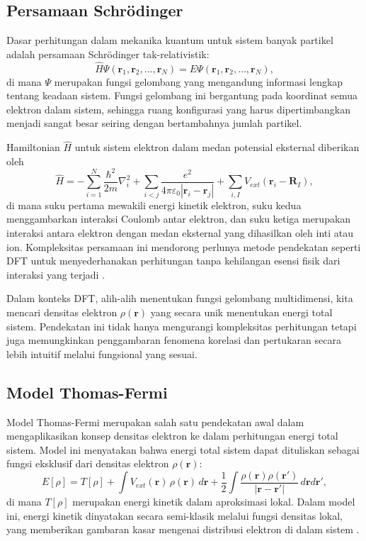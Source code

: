 \subsection{Persamaan Schrödinger}
Dasar perhitungan dalam mekanika kuantum untuk sistem banyak partikel adalah persamaan Schrödinger tak-relativistik:
\begin{equation}
    \hat{H}\Psi(\mathbf{r}_1,\mathbf{r}_2,\ldots,\mathbf{r}_N) = E\Psi(\mathbf{r}_1,\mathbf{r}_2,\ldots,\mathbf{r}_N),
\end{equation}
di mana \(\Psi\) merupakan fungsi gelombang yang mengandung informasi lengkap tentang keadaan sistem. Fungsi gelombang ini bergantung pada koordinat semua elektron dalam sistem, sehingga ruang konfigurasi yang harus dipertimbangkan menjadi sangat besar seiring dengan bertambahnya jumlah partikel.

Hamiltonian \(\hat{H}\) untuk sistem elektron dalam medan potensial eksternal diberikan oleh
\begin{equation}
    \hat{H} = -\sum_{i=1}^{N}\frac{\hbar^2}{2m}\nabla_i^2 + \sum_{i<j} \frac{e^2}{4\pi\varepsilon_0|\mathbf{r}_i-\mathbf{r}_j|} + \sum_{i,I} V_{ext}(\mathbf{r}_i-\mathbf{R}_I),
\end{equation}
di mana suku pertama mewakili energi kinetik elektron, suku kedua menggambarkan interaksi Coulomb antar elektron, dan suku ketiga merupakan interaksi antara elektron dengan medan eksternal yang dihasilkan oleh inti atau ion. Kompleksitas persamaan ini mendorong perlunya metode pendekatan seperti DFT untuk menyederhanakan perhitungan tanpa kehilangan esensi fisik dari interaksi yang terjadi \citep{kohn_self-consistent_1965}.

Dalam konteks DFT, alih-alih menentukan fungsi gelombang multidimensi, kita mencari densitas elektron \(\rho(\mathbf{r})\) yang secara unik menentukan energi total sistem. Pendekatan ini tidak hanya mengurangi kompleksitas perhitungan tetapi juga memungkinkan penggambaran fenomena korelasi dan pertukaran secara lebih intuitif melalui fungsional yang sesuai.

\subsection{Model Thomas-Fermi}
Model Thomas-Fermi merupakan salah satu pendekatan awal dalam mengaplikasikan konsep densitas elektron ke dalam perhitungan energi total sistem. Model ini menyatakan bahwa energi total sistem dapat dituliskan sebagai fungsi eksklusif dari densitas elektron \(\rho(\mathbf{r})\):
\begin{equation}
    E[\rho] = T[\rho] + \int V_{ext}(\mathbf{r})\,\rho(\mathbf{r})\,d\mathbf{r} + \frac{1}{2}\int \frac{\rho(\mathbf{r})\rho(\mathbf{r'})}{|\mathbf{r}-\mathbf{r'}|}\, d\mathbf{r}d\mathbf{r'},
\end{equation}
di mana \(T[\rho]\) merupakan energi kinetik dalam aproksimasi lokal. Dalam model ini, energi kinetik dinyatakan secara semi-klasik melalui fungsi densitas lokal, yang memberikan gambaran kasar mengenai distribusi elektron di dalam sistem \citep{thomas_calculation_1927, fermi_statistical_1927}.

